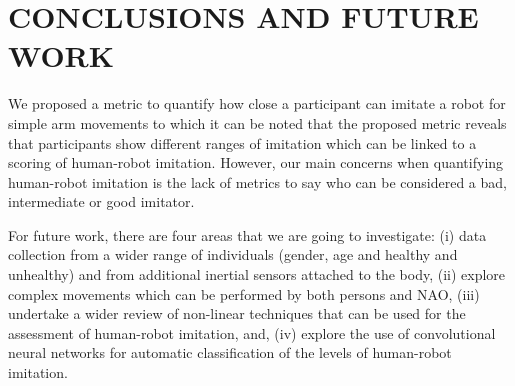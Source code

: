 \documentclass{sig-alternate-05-2015}
\begin{document}
\section{CONCLUSIONS AND FUTURE WORK}
We proposed a metric to quantify how close a participant can imitate a robot for simple arm
movements to which it can be noted that the proposed metric reveals that participants show different ranges 
of imitation which can be linked to a scoring of human-robot imitation.
However, our main concerns when quantifying human-robot imitation
is the lack of metrics to say who can be considered a bad, intermediate or good imitator.

For future work, there are four areas that we are going to investigate:
(i) data collection from a wider range of individuals (gender, age and healthy and unhealthy)
and from additional inertial sensors attached to the body,
(ii) explore complex movements which can be performed by both persons and NAO,
(iii) undertake a wider review of non-linear techniques that can be used for 
the assessment of human-robot imitation, and, 
(iv) explore the use of convolutional neural networks for automatic 
classification of the levels of human-robot imitation.






%
%
\end{document}

